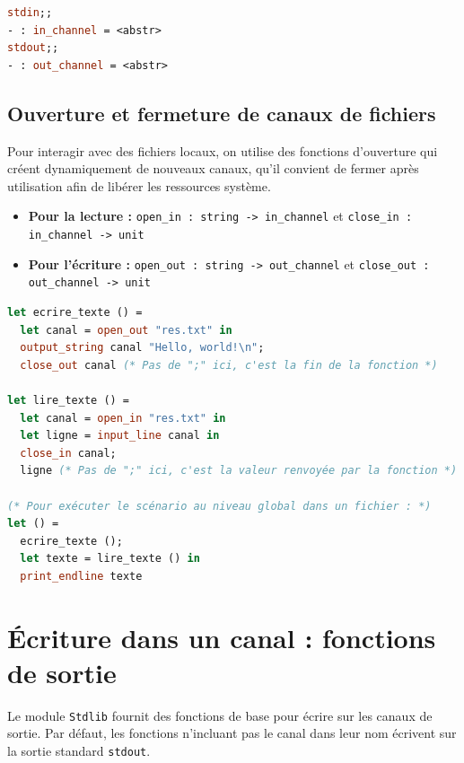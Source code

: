 \documentclass{article}
\begin{document}
\begin{lstlisting}[language=Caml]
stdin;;
- : in_channel = <abstr>
stdout;;
- : out_channel = <abstr>
\end{lstlisting}

\subsection{Ouverture et fermeture de canaux de fichiers}

Pour interagir avec des fichiers locaux, on utilise des fonctions d'ouverture qui créent dynamiquement de nouveaux canaux, qu'il convient de fermer après utilisation afin de libérer les ressources système.

\begin{itemize}
    \item \textbf{Pour la lecture :} \texttt{open\_in : string -> in\_channel} et \texttt{close\_in : in\_channel -> unit}
    \item \textbf{Pour l'écriture :} \texttt{open\_out : string -> out\_channel} et \texttt{close\_out : out\_channel -> unit}
\end{itemize}

\begin{lstlisting}[language=Caml]
let ecrire_texte () =
  let canal = open_out "res.txt" in
  output_string canal "Hello, world!\n";
  close_out canal (* Pas de ";" ici, c'est la fin de la fonction *)

let lire_texte () =
  let canal = open_in "res.txt" in
  let ligne = input_line canal in
  close_in canal;
  ligne (* Pas de ";" ici, c'est la valeur renvoyée par la fonction *)

(* Pour exécuter le scénario au niveau global dans un fichier : *)
let () = 
  ecrire_texte ();
  let texte = lire_texte () in
  print_endline texte
\end{lstlisting}

\section{Écriture dans un canal : fonctions de sortie}

Le module \texttt{Stdlib} fournit des fonctions de base pour écrire sur les canaux de sortie. Par défaut, les fonctions n'incluant pas le canal dans leur nom écrivent sur la sortie standard \texttt{stdout}.
\end{document}
